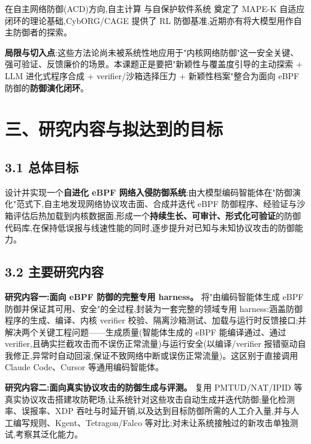 在自主网络防御(ACD)方向,自主计算\supercite{kephart2003autonomic} 与自保护软件系统\supercite{yuan2014selfprotecting} 奠定了 MAPE-K 自适应闭环的理论基础,CybORG/CAGE\supercite{standen2021cyborg} 提供了 RL 防御基准,近期亦有将大模型用作自主防御者的探索\supercite{castro2025llmacd}。

\textbf{局限与切入点}:这些方法论尚未被系统性地应用于"内核网络防御"这一安全关键、强可验证、反馈廉价的场景。本课题正是要把"新颖性与覆盖度引导的主动探索 + LLM 进化式程序合成 + verifier/沙箱选择压力 + 新颖性档案"整合为面向 eBPF 防御的\textbf{防御演化闭环}。

\section*{三、研究内容与拟达到的目标}
\subsection*{3.1 总体目标}
设计并实现一个\textbf{自进化 eBPF 网络入侵防御系统}:由大模型编码智能体在"防御演化"范式下,自主地发现网络协议攻击面、合成并迭代 eBPF 防御程序、经验证与沙箱评估后热加载到内核数据面,形成一个\textbf{持续生长、可审计、形式化可验证}的防御代码库,在保持低误报与线速性能的同时,逐步提升对已知与未知协议攻击的防御能力。

\subsection*{3.2 主要研究内容}
\textbf{研究内容一:面向 eBPF 防御的完整专用 harness。} 将"由编码智能体生成 eBPF 防御并保证其可用、安全"的全过程,封装为一套完整的领域专用 harness:涵盖防御程序的生成、编译、内核 verifier 校验、隔离沙箱测试、加载与运行时反馈接口;并解决两个关键工程问题——生成质量(智能体生成的 eBPF 能编译通过、通过 verifier,且确实拦截攻击而不误伤正常流量)与运行安全(以编译/verifier 报错驱动自我修正,异常时自动回滚,保证不致网络中断或误伤正常流量)。这区别于直接调用 Claude Code、Cursor 等通用编码智能体\supercite{yang2024sweagent,anthropic2025claudecode,cursor2024}。

\textbf{研究内容二:面向真实协议攻击的防御生成与评测。} 复用 PMTUD/NAT/IPID 等真实协议攻击\supercite{feng2025pmtudisolation,yang2024natwifi,feng2020mixedipid}搭建攻防靶场,让系统针对这些攻击自动生成并迭代防御;量化检测率、误报率、XDP 吞吐与时延开销,以及达到目标防御所需的人工介入量,并与人工编写规则、Kgent\supercite{yang2024kgent}、Tetragon\supercite{tetragon2022}/Falco\supercite{falco2018} 等对比;对未让系统接触过的新攻击单独测试,考察其泛化能力。

